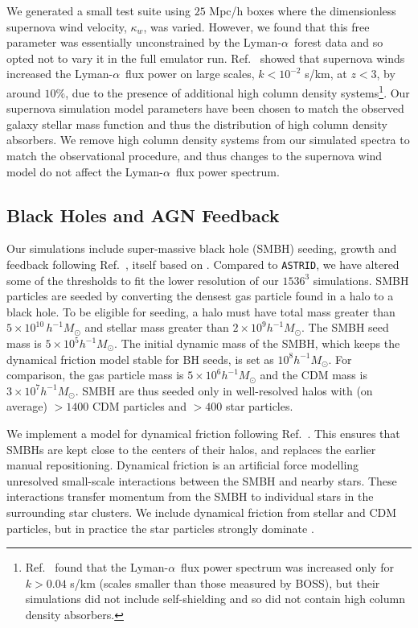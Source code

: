 \documentclass[a4paper,11pt]{article}
\newcommand{\Lya}{Lyman-$\alpha$}
\newcommand{\astrid}{\texttt{ASTRID}}
\begin{document}
We generated a small test suite using $25$ Mpc/h boxes where the dimensionless supernova wind velocity, $\kappa_w$, was varied. However, we found that this free parameter was essentially unconstrained by the \Lya~forest data and so opted not to vary it in the full emulator run. Ref.~\cite{Bolton:2017} showed that supernova winds increased the \Lya~flux power on large scales, $k < 10^{-2}$ s/km, at $z < 3$, by around $10\%$, due to the presence of additional high column density systems\footnote{Ref.~\cite{Viel:2013} found that the \Lya~flux power spectrum was increased only for $ k > 0.04$ s/km (scales smaller than those measured by BOSS), but their simulations did not include self-shielding and so did not contain high column density absorbers.}. Our supernova simulation model parameters have been chosen to match the observed galaxy stellar mass function and thus the distribution of high column density absorbers. We remove high column density systems from our simulated spectra to match the observational procedure, and thus changes to the supernova wind model do not affect the \Lya~flux power spectrum.

\subsection{Black Holes and AGN Feedback}
\label{sec:agn}

Our simulations include super-massive black hole (SMBH) seeding, growth and feedback following Ref.~\cite{Ni:2022}, itself based on \cite{Feng:2016,SDH2005,DSH2005}. Compared to \astrid, we have altered some of the thresholds to fit the lower resolution of our $1536^3$ simulations. SMBH particles are seeded by converting the densest gas particle found in a halo to a black hole. To be eligible for seeding, a halo must have total mass greater than $5\times 10^{10}\,h^{-1}M_\odot$ and stellar mass greater than $2 \times 10^9 h^{-1} M_\odot$. The SMBH seed mass is $5 \times 10^{5} h^{-1} M_\odot$. The initial dynamic mass of the SMBH, which keeps the dynamical friction model stable for BH seeds, is set as $10^{8} h^{-1} M_\odot$. For comparison, the gas particle mass is $5 \times 10^6 h^{-1} M_\odot$ and the CDM mass is $ 3 \times 10^7 h^{-1} M_\odot$. SMBH are thus seeded only in well-resolved halos with (on average) $> 1400$ CDM particles and $>400$ star particles.

We implement a model for dynamical friction following Ref.~\citep{Chen:2021}. This ensures that SMBHs are kept close to the centers of their halos, and replaces the earlier manual repositioning. Dynamical friction is an artificial force modelling unresolved small-scale interactions between the SMBH and nearby stars. These interactions transfer momentum from the SMBH to individual stars in the surrounding star clusters. We include dynamical friction from stellar and CDM particles, but in practice the star particles strongly dominate \cite{Chen:2021}.
\end{document}
